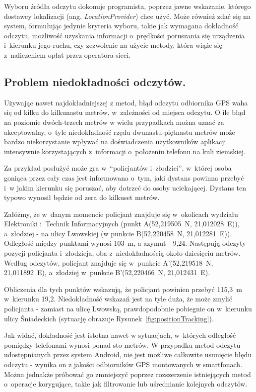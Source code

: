 \documentclass[a4paper,twocolumn,11pt]{article}
\begin{document}
Wyboru źródła odczytu dokonuje programista, poprzez jawne wskazanie, którego dostawcy lokalizacji (ang. \emph{LocationProvider}) chce użyć.
Może również zdać się na system, formułując jedynie kryteria wyboru, takie jak wymagana dokładność odczytu, możliwość uzyskania informacji o~prędkości poruszania się urządzenia i~kierunku jego ruchu, czy zezwolenie na użycie metody, która wiąże się z~naliczeniem opłat przez operatora sieci.


\subsection{Problem niedokładności odczytów.}
 Używając nawet najdokładniejszej z metod, błąd odczytu odbiornika GPS waha się od kilku do kilkunastu metrów, w~zależności od miejsca odczytu.
 O ile błąd na poziomie dwóch-trzech metrów w wielu przypadkach można uznać za akceptowalny, o~tyle niedokładność rzędu dwunastu-piętnastu metrów może bardzo niekorzystanie wpływać na doświadczenia użytkowników aplikacji intensywnie korzystających z~informacji o~położeniu telefonu na kuli ziemskiej.
 
 Za przykład posłużyć może gra w~``policjantów i~złodziei'', w~której osoba goniąca przez cały czas jest informowana o~tym, jaki dystans powinna przebyć i~w jakim kierunku się poruszać, aby dotrzeć do osoby uciekającej.
 Dystans ten typowo wynosił będzie od zera do kilkuset metrów.
 
 Załóżmy, że w~danym momencie policjant znajduje się w~okolicach wydziału Elektroniki i~Technik Informacyjnych (punkt A(52,219505\textdegree~N, 21,012028\textdegree~E)), a~złodziej - na ulicy Lwowskiej (w punkcie B(52,220458\textdegree~N, 21,012281\textdegree~E)).
 Odległość między punktami wynosi 103~m, a azymut - 9,24\textdegree.
 Następują odczyty pozycji policjanta i~złodzieja, oba z~niedokładnością około dziesięciu metrów.
 Według odczytów, policjant znajduje się w~punkcie A'(52,219518\textdegree~N, 21,011892\textdegree~E), a~złodziej w~punkcie B'(52,220466\textdegree~N, 21,012431\textdegree~E).
 
 Obliczenia dla tych punktów wskazują, że policjant powinien przebyć 115,3~m w~kierunku 19,2\textdegree.
 Niedokładność wskazań jest na tyle duża, że może zmylić policjanta - zamiast na ulicę Lwowską, prawdopodobnie pobiegnie on w~kierunku ulicy Śniadeckich (sytuację obrazuje Rysunek~\ref{fig:positionTracking}).


 
 Jak widać, dokładność jest istotna nawet w sytuacjach, w~których odległość pomiędzy telefonami wynosi ponad sto metrów.
 W przypadku metod odczytu udostępnianych przez system Android, nie jest możliwe całkowite usunięcie błędu odczytu - wynika on z jakości odbiorników GPS montowanych w smartfonach. Można jednakże próbować go zmniejszyć poprzez rozszerzenie istniejących metod o~operacje korygujące, takie jak filtrowanie lub uśrednianie kolejnych odczytów.
\end{document}
